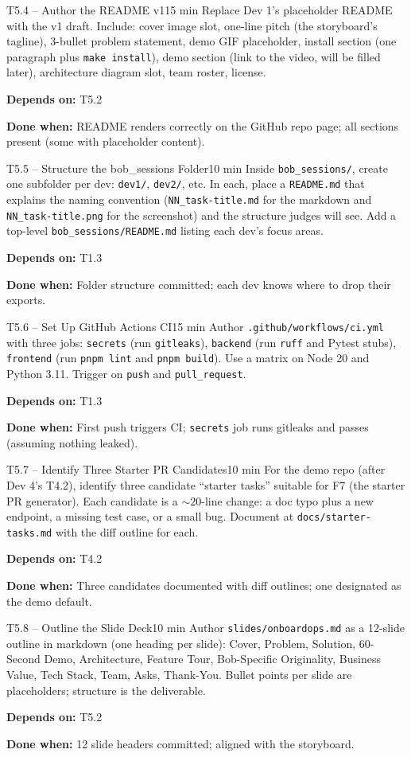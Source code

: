 \documentclass[11pt,letterpaper]{article}
\newcommand{\acceptance}[1]{\par\smallskip\textcolor{ibmgreen}{\textbf{Done when:}} #1}
\newcommand{\depends}[1]{\par\smallskip\textcolor{ibmorange}{\textbf{Depends on:}} #1}
\begin{document}
\begin{task}{T5.4 -- Author the README v1}{15 min}
Replace Dev 1's placeholder README with the v1 draft. Include: cover image slot, one-line pitch (the storyboard's tagline), 3-bullet problem statement, demo GIF placeholder, install section (one paragraph plus \texttt{make install}), demo section (link to the video, will be filled later), architecture diagram slot, team roster, license.
\depends{T5.2}
\acceptance{README renders correctly on the GitHub repo page; all sections present (some with placeholder content).}
\end{task}

\begin{task}{T5.5 -- Structure the bob\_sessions Folder}{10 min}
Inside \texttt{bob\_sessions/}, create one subfolder per dev: \texttt{dev1/}, \texttt{dev2/}, etc. In each, place a \texttt{README.md} that explains the naming convention (\texttt{NN\_task-title.md} for the markdown and \texttt{NN\_task-title.png} for the screenshot) and the structure judges will see. Add a top-level \texttt{bob\_sessions/README.md} listing each dev's focus areas.
\depends{T1.3}
\acceptance{Folder structure committed; each dev knows where to drop their exports.}
\end{task}

\begin{task}{T5.6 -- Set Up GitHub Actions CI}{15 min}
Author \texttt{.github/workflows/ci.yml} with three jobs: \texttt{secrets} (run \texttt{gitleaks}), \texttt{backend} (run \texttt{ruff} and Pytest stubs), \texttt{frontend} (run \texttt{pnpm lint} and \texttt{pnpm build}). Use a matrix on Node 20 and Python 3.11. Trigger on \texttt{push} and \texttt{pull\_request}.
\depends{T1.3}
\acceptance{First push triggers CI; \texttt{secrets} job runs gitleaks and passes (assuming nothing leaked).}
\end{task}

\begin{task}{T5.7 -- Identify Three Starter PR Candidates}{10 min}
For the demo repo (after Dev 4's T4.2), identify three candidate ``starter tasks'' suitable for F7 (the starter PR generator). Each candidate is a ${\sim}20$-line change: a doc typo plus a new endpoint, a missing test case, or a small bug. Document at \texttt{docs/starter-tasks.md} with the diff outline for each.
\depends{T4.2}
\acceptance{Three candidates documented with diff outlines; one designated as the demo default.}
\end{task}

\begin{task}{T5.8 -- Outline the Slide Deck}{10 min}
Author \texttt{slides/onboardops.md} as a 12-slide outline in markdown (one heading per slide): Cover, Problem, Solution, 60-Second Demo, Architecture, Feature Tour, Bob-Specific Originality, Business Value, Tech Stack, Team, Asks, Thank-You. Bullet points per slide are placeholders; structure is the deliverable.
\depends{T5.2}
\acceptance{12 slide headers committed; aligned with the storyboard.}
\end{task}
\end{document}
